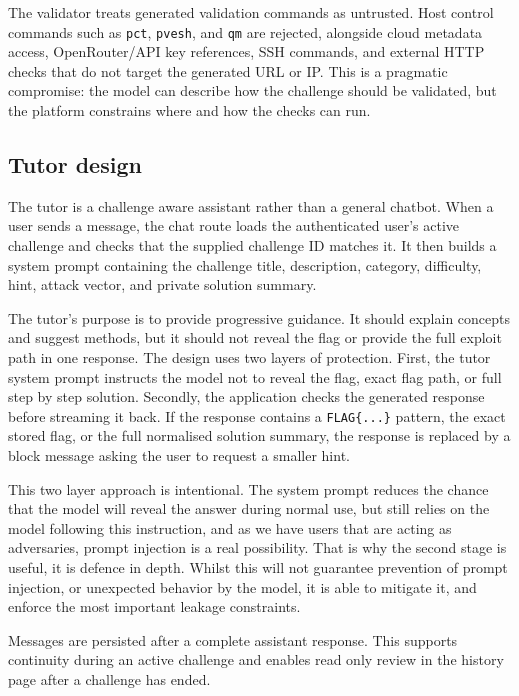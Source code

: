 The validator treats generated validation commands as untrusted. Host control commands such as \lstinline|pct|, \lstinline|pvesh|, and \lstinline|qm| are rejected, alongside cloud metadata access, OpenRouter/API key references, SSH commands, and external HTTP checks that do not target the generated URL or IP. This is a pragmatic compromise: the model can describe how the challenge should be validated, but the platform constrains where and how the checks can run.

\subsection{Tutor design}\label{sec:tutor}

The tutor is a challenge aware assistant rather than a general chatbot. When a user sends a message, the chat route loads the authenticated user's active challenge and checks that the supplied challenge ID matches it. It then builds a system prompt containing the challenge title, description, category, difficulty, hint, attack vector, and private solution summary.

The tutor's purpose is to provide progressive guidance. It should explain concepts and suggest methods, but it should not reveal the flag or provide the full exploit path in one response. The design uses two layers of protection. First, the tutor system prompt instructs the model not to reveal the flag, exact flag path, or full step by step solution. Secondly, the application checks the generated response before streaming it back. If the response contains a \lstinline|FLAG{...}| pattern, the exact stored flag, or the full normalised solution summary, the response is replaced by a block message asking the user to request a smaller hint.

This two layer approach is intentional. The system prompt reduces the chance that the model will reveal the answer during normal use, but still relies on the model following this instruction, and as we have users that are acting as adversaries, prompt injection is a real possibility. That is why the second stage is useful, it is defence in depth. Whilst this will not guarantee prevention of prompt injection, or unexpected behavior by the model, it is able to mitigate it, and enforce the most important leakage constraints.

Messages are persisted after a complete assistant response. This supports continuity during an active challenge and enables read only review in the history page after a challenge has ended.

